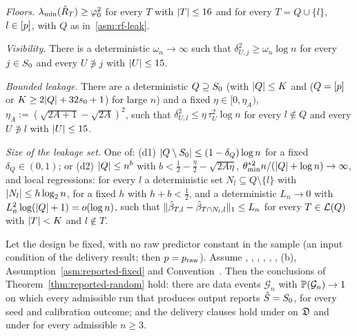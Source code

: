 \begin{localassumption}\label{asm:reported-fixed}
\begin{asmitems}
  \item\label{asm:rf-floor} \emph{Floors.} $\lmin(\Rhat_T)\ge\varphi_0^2$ for every $T$ with $\abs{T}\le16$ and for every
    $T=Q\cup\{l\}$, $l\in\set{p}$, with $Q$ as in~\ref{asm:rf-leak}.
  \item\label{asm:rf-vis} \emph{Visibility.} There is a deterministic $\omega_n\to\infty$ such that
    $\delta^2_{U,j}\ge\omega_n\log n$ for every $j\in\Sz$ and every $U\not\ni j$ with $\abs{U}\le15$.
  \item\label{asm:rf-leak} \emph{Bounded leakage.} There are a deterministic $Q\supseteq\Sz$ (with $\abs{Q}\le K$ and
    ($Q=\set{p}$ or $K\ge2\abs{Q}+32\sz+1$) for large $n$) and a fixed $\eta\in[0,\eta_A)$,
    $\eta_A:=(\sqrt{2A+1}-\sqrt{2A})^2$, such that $\delta^2_{U,l}\le\eta\,\tau^2_U\log n$ for every $l\notin Q$ and every
    $U\not\ni l$ with $\abs{U}\le15$.
  \item\label{asm:rf-size} \emph{Size of the leakage set.} One of: (d1) $\abs{Q\setminus\Sz}\le(1-\delta_Q)\log n$ for a
    fixed $\delta_Q\in(0,1)$; or (d2) $\abs{Q}\le n^b$ with $b<\tfrac12-\tfrac\eta2-\sqrt{2A\eta}$,
    $\theta^{*2}_{\min}n/(\abs{Q}+\log n)\to\infty$, and local regressions: for every $l$ a deterministic set
    $N_l\subseteq Q\setminus\{l\}$ with $\abs{N_l}\le h\log_2n$, for a fixed $h$ with $h+b<\tfrac12$, and a deterministic $L_n\to0$ with
    $L_n^2\log(\abs{Q}+1)=o(\log n)$, such that $\norm{\hat\beta_{T,l}-\hat\beta_{T\cap N_l,l}}_1\le L_n$ for every
    $T\in\Lat(Q)$ with $\abs{T}<K$ and $l\notin T$.
\end{asmitems}
\end{localassumption}

\begin{theorem}\label{thm:reported-fixed}
Let the design be fixed, with no raw predictor constant in the sample (an input condition of the delivery result; then
$p=\praw$). Assume , , , ,
, , (b), Assumption~\ref{asm:reported-fixed} and Convention~. Then the conclusions of
Theorem~\ref{thm:reported-random} hold: there are data events $\mathcal G_n$ with $\P(\mathcal G_n)\to1$ on which every
admissible run that produces output reports $\Shat=\Sz$, for every seed and calibration outcome; and the delivery
clauses hold under  on $\Dom$ and under  for every admissible $n\ge3$.
\end{theorem}

